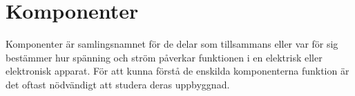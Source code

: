 \chapter{Komponenter}
\label{ch:komponenter}

Komponenter är samlingsnamnet för de delar som tillsammans eller var för sig
bestämmer hur spänning och ström påverkar funktionen i en elektrisk eller
elektronisk apparat.
För att kunna förstå de enskilda komponenterna funktion är det oftast nödvändigt
att studera deras uppbyggnad.